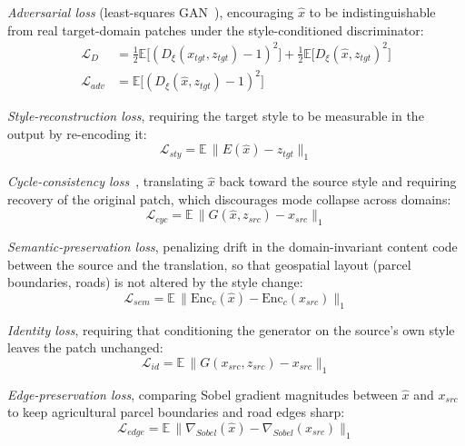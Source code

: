 \documentclass[conference]{IEEEtran}
\begin{document}
\emph{Adversarial loss} (least-squares GAN~\cite{mao2017lsgan}), encouraging $\hat{x}$ to be indistinguishable from real target-domain patches under the style-conditioned discriminator:
\begin{align}
\mathcal{L}_D &= \tfrac{1}{2}\mathbb{E}\big[(D_\xi(x_{tgt}, z_{tgt}) - 1)^2\big] + \tfrac{1}{2}\mathbb{E}\big[D_\xi(\hat{x}, z_{tgt})^2\big] \\
\mathcal{L}_{adv} &= \mathbb{E}\big[(D_\xi(\hat{x}, z_{tgt}) - 1)^2\big]
\label{eq:adv}
\end{align}

\emph{Style-reconstruction loss}, requiring the target style to be measurable in the output by re-encoding it:
\begin{equation}
\mathcal{L}_{sty} = \mathbb{E}\,\lVert E(\hat{x}) - z_{tgt} \rVert_1
\label{eq:sty}
\end{equation}

\emph{Cycle-consistency loss}~\cite{zhu2017cyclegan}, translating $\hat{x}$ back toward the source style and requiring recovery of the original patch, which discourages mode collapse across domains:
\begin{equation}
\mathcal{L}_{cyc} = \mathbb{E}\,\lVert G(\hat{x}, z_{src}) - x_{src} \rVert_1
\label{eq:cyc}
\end{equation}

\emph{Semantic-preservation loss}, penalizing drift in the domain-invariant content code between the source and the translation, so that geospatial layout (parcel boundaries, roads) is not altered by the style change:
\begin{equation}
\mathcal{L}_{sem} = \mathbb{E}\,\lVert \mathrm{Enc}_c(\hat{x}) - \mathrm{Enc}_c(x_{src}) \rVert_1
\label{eq:sem}
\end{equation}

\emph{Identity loss}, requiring that conditioning the generator on the source's own style leaves the patch unchanged:
\begin{equation}
\mathcal{L}_{id} = \mathbb{E}\,\lVert G(x_{src}, z_{src}) - x_{src} \rVert_1
\label{eq:id}
\end{equation}

\emph{Edge-preservation loss}, comparing Sobel gradient magnitudes between $\hat{x}$ and $x_{src}$ to keep agricultural parcel boundaries and road edges sharp:
\begin{equation}
\mathcal{L}_{edge} = \mathbb{E}\,\lVert \nabla_{Sobel}(\hat{x}) - \nabla_{Sobel}(x_{src}) \rVert_1
\label{eq:edge}
\end{equation}
\end{document}
